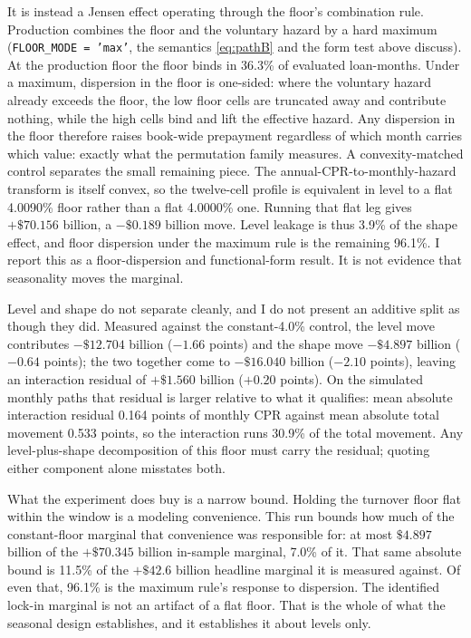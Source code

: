 \documentclass[12pt]{article}
\begin{document}
It is instead a Jensen effect operating through the floor's combination rule. Production combines the floor and the voluntary hazard by a hard maximum (\texttt{FLOOR\_MODE = 'max'}, the semantics \eqref{eq:pathB} and the form test above discuss). At the production floor the floor binds in 36.3\% of evaluated loan-months. Under a maximum, dispersion in the floor is one-sided: where the voluntary hazard already exceeds the floor, the low floor cells are truncated away and contribute nothing, while the high cells bind and lift the effective hazard. Any dispersion in the floor therefore raises book-wide prepayment regardless of which month carries which value: exactly what the permutation family measures. A convexity-matched control separates the small remaining piece. The annual-CPR-to-monthly-hazard transform is itself convex, so the twelve-cell profile is equivalent in level to a flat 4.0090\% floor rather than a flat 4.0000\% one. Running that flat leg gives $+\$70.156$ billion, a $-\$0.189$ billion move. Level leakage is thus 3.9\% of the shape effect, and floor dispersion under the maximum rule is the remaining 96.1\%. I report this as a floor-dispersion and functional-form result. It is not evidence that seasonality moves the marginal.

Level and shape do not separate cleanly, and I do not present an additive split as though they did. Measured against the constant-4.0\% control, the level move contributes $-\$12.704$ billion ($-1.66$ points) and the shape move $-\$4.897$ billion ($-0.64$ points); the two together come to $-\$16.040$ billion ($-2.10$ points), leaving an interaction residual of $+\$1.560$ billion ($+0.20$ points). On the simulated monthly paths that residual is larger relative to what it qualifies: mean absolute interaction residual 0.164 points of monthly CPR against mean absolute total movement 0.533 points, so the interaction runs 30.9\% of the total movement. Any level-plus-shape decomposition of this floor must carry the residual; quoting either component alone misstates both.

What the experiment does buy is a narrow bound. Holding the turnover floor flat within the window is a modeling convenience. This run bounds how much of the constant-floor marginal that convenience was responsible for: at most $\$4.897$ billion of the $+\$70.345$ billion in-sample marginal, 7.0\% of it. That same absolute bound is 11.5\% of the $+\$42.6$ billion headline marginal it is measured against. Of even that, 96.1\% is the maximum rule's response to dispersion. The identified lock-in marginal is not an artifact of a flat floor. That is the whole of what the seasonal design establishes, and it establishes it about levels only.
\end{document}
